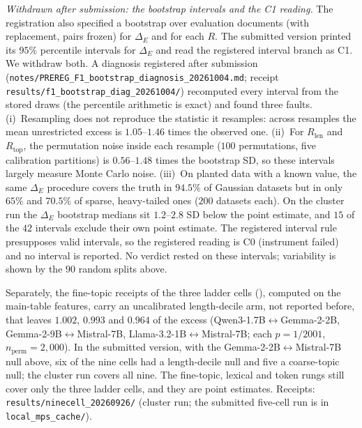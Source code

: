\emph{Withdrawn after submission: the bootstrap intervals and the C1 reading.} The registration also
specified a bootstrap over evaluation documents (with replacement, pairs frozen) for $\Delta_E$ and for
each $R$. The submitted version printed its $95\%$ percentile intervals for $\Delta_E$ and read the
registered interval branch as C1. We withdraw both. A diagnosis registered after submission
(\texttt{notes/PREREG\_F1\_bootstrap\_diagnosis\_20261004.md}; receipt
\texttt{results/f1\_bootstrap\_diag\_20261004/}) recomputed every interval from the stored draws (the
percentile arithmetic is exact) and found three faults. (i)~Resampling does not reproduce the statistic
it resamples: across resamples the mean unrestricted excess is $1.05$--$1.46$ times the observed one.
(ii)~For $R_{\text{len}}$ and $R_{\text{top}}$, the permutation noise inside each resample ($100$
permutations, five calibration partitions) is $0.56$--$1.48$ times the bootstrap SD, so these intervals
largely measure Monte Carlo noise. (iii)~On planted data with a known value, the same $\Delta_E$
procedure covers the truth in $94.5\%$ of Gaussian datasets but in only $65\%$ and $70.5\%$ of sparse,
heavy-tailed ones ($200$ datasets each). On the cluster run the $\Delta_E$ bootstrap medians sit
$1.2$--$2.8$ SD below the point estimate, and $15$ of the $42$ intervals exclude their own point
estimate. The registered interval rule presupposes valid intervals, so the registered reading is C0
(instrument failed) and no interval is reported. No verdict rested on these intervals; variability is
shown by the $90$ random splits above.

Separately, the fine-topic receipts of the three ladder cells (), computed on the
main-table features, carry an uncalibrated length-decile arm, not reported before, that leaves
$1.002$, $0.993$ and $0.964$ of the excess (Qwen3-1.7B$\leftrightarrow$Gemma-2-2B,
Gemma-2-9B$\leftrightarrow$Mistral-7B, Llama-3.2-1B$\leftrightarrow$Mistral-7B; each $p=1/2001$,
$n_{\text{perm}}{=}2{,}000$). In the submitted version, with the Gemma-2-2B$\leftrightarrow$Mistral-7B
null above, six of the nine cells had a length-decile null and five a coarse-topic null; the cluster
run covers all nine. The fine-topic, lexical and token rungs still cover only the three ladder cells,
and they are point estimates. Receipts: \texttt{results/ninecell\_20260926/} (cluster run; the
submitted five-cell run is in \texttt{local\_mps\_cache/}).

